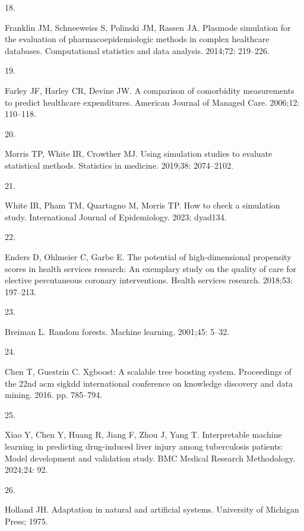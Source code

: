 \documentclass[10pt,letterpaper]{article}
\newlength{\cslhangindent}
\newlength{\csllabelwidth}
\newenvironment{CSLReferences}[2] %
 {\begin{list}{}{%
  \setlength{\itemindent}{0pt}
  \setlength{\leftmargin}{0pt}
  \setlength{\parsep}{0pt}
  \ifodd #1
   \setlength{\leftmargin}{\cslhangindent}
   \setlength{\itemindent}{-1\cslhangindent}
  \fi
  \setlength{\itemsep}{#2\baselineskip}}}
 {\end{list}}
\newcommand{\CSLLeftMargin}[1]{\parbox[t]{\csllabelwidth}{#1}}
\newcommand{\CSLRightInline}[1]{\parbox[t]{\linewidth - \csllabelwidth}{#1}\break}
\begin{document}
\begin{CSLReferences}{0}{1}
\CSLLeftMargin{18. }%
\CSLRightInline{Franklin JM, Schneeweiss S, Polinski JM, Rassen JA.
Plasmode simulation for the evaluation of pharmacoepidemiologic methods
in complex healthcare databases. Computational statistics and data
analysis. 2014;72: 219--226. }

\CSLLeftMargin{19. }%
\CSLRightInline{Farley JF, Harley CR, Devine JW. A comparison of
comorbidity measurements to predict healthcare expenditures. American
Journal of Managed Care. 2006;12: 110--118. }

\CSLLeftMargin{20. }%
\CSLRightInline{Morris TP, White IR, Crowther MJ. Using simulation
studies to evaluate statistical methods. Statistics in medicine.
2019;38: 2074--2102. }

\CSLLeftMargin{21. }%
\CSLRightInline{White IR, Pham TM, Quartagno M, Morris TP. How to check
a simulation study. International Journal of Epidemiology. 2023;
dyad134. }

\CSLLeftMargin{22. }%
\CSLRightInline{Enders D, Ohlmeier C, Garbe E. The potential of
high-dimensional propensity scores in health services research: An
exemplary study on the quality of care for elective percutaneous
coronary interventions. Health services research. 2018;53: 197--213. }

\CSLLeftMargin{23. }%
\CSLRightInline{Breiman L. Random forests. Machine learning. 2001;45:
5--32. }

\CSLLeftMargin{24. }%
\CSLRightInline{Chen T, Guestrin C. Xgboost: A scalable tree boosting
system. Proceedings of the 22nd acm sigkdd international conference on
knowledge discovery and data mining. 2016. pp. 785--794. }

\CSLLeftMargin{25. }%
\CSLRightInline{Xiao Y, Chen Y, Huang R, Jiang F, Zhou J, Yang T.
Interpretable machine learning in predicting drug-induced liver injury
among tuberculosis patients: Model development and validation study. BMC
Medical Research Methodology. 2024;24: 92. }

\CSLLeftMargin{26. }%
\CSLRightInline{Holland JH. Adaptation in natural and artificial
systems. University of Michigan Press; 1975. }


\end{CSLReferences}
\end{document}

